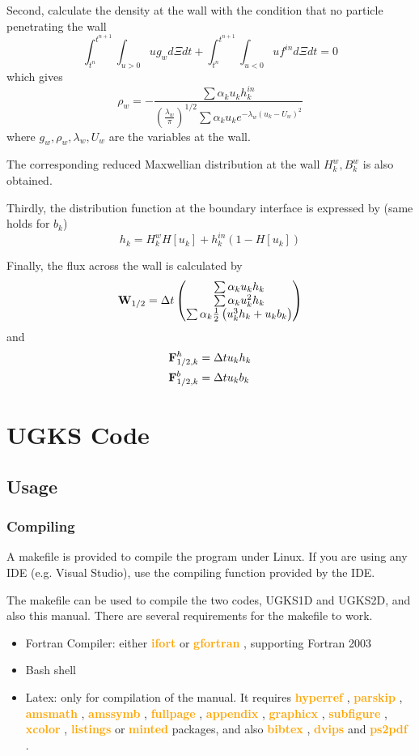 \documentclass[a4paper]{book}
\newcommand{\hi}[1]{
    \textbf{\textcolor{orange}{#1}}
}
\begin{document}
Second, calculate the density at the wall with the condition that no particle penetrating the wall
$$\int_{t^n}^{t^{n+1}}\int_{u>0} ug_w d\Xi dt+\int_{t^n}^{t^{n+1}}\int_{u<0} uf^{in}d\Xi dt=0$$
which gives
$$\rho_w = -\frac{\sum\alpha_k u_k h_k^{in}}{\left(\frac{\lambda_w}{\pi}\right)^{1/2}\sum\alpha_k u_k e^{-\lambda_w(u_k-U_w)^2}}$$
where $g_w,\rho_w,\lambda_w,U_w$ are the variables at the wall.

The corresponding reduced Maxwellian distribution at the wall $H_k^w,B_k^w$ is also obtained.

Thirdly, the distribution function at the boundary interface is expressed by (same holds for $b_k$)
$$h_k = H_k^wH[u_k]+h_k^{in}(1-H[u_k])$$

Finally, the flux across the wall is calculated by
$$
{\bf W}_{1/2} = \Delta t
\begin{pmatrix}
    \sum\alpha_k u_k h_k\\
    \sum\alpha_k u_k^2 h_k\\
    \sum\alpha_k \frac{1}{2}\left(u_k^3 h_k+u_k b_k\right)
\end{pmatrix} 
$$
and
$$
\begin{aligned}
    {\bf F}_{1/2,k}^h &= \Delta t u_k h_k\\
    {\bf F}_{1/2,k}^b &= \Delta t u_k b_k
\end{aligned} 
$$

\chapter{UGKS Code}
\section{Usage}
\subsection{Compiling}
A makefile is provided to compile the program under Linux. If you are using any IDE (e.g. Visual Studio), use the compiling function provided by the IDE.

The makefile can be used to compile the two codes, UGKS1D and UGKS2D, and also this manual. There are several requirements for the makefile to work.
\begin{itemize}
    \item Fortran Compiler: either \hi{ifort} or \hi{gfortran}, supporting Fortran 2003
    \item Bash shell
    \item Latex: only for compilation of the manual. It requires \hi{hyperref}, \hi{parskip}, \hi{amsmath}, \hi{amssymb}, \hi{fullpage}, \hi{appendix}, \hi{graphicx}, \hi{subfigure}, \hi{xcolor}, \hi{listings} or \hi{minted} packages, and also \hi{bibtex}, \hi{dvips} and \hi{ps2pdf}.
\end{itemize}
\end{document}
